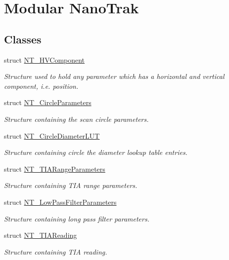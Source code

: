 \hypertarget{group___modular_nano_trak}{}\section{Modular Nano\+Trak}
\label{group___modular_nano_trak}
\subsection*{Classes}
\begin{DoxyCompactItemize}
\item 
struct \hyperlink{struct_n_t___h_v_component}{N\+T\+\_\+\+H\+V\+Component}
\begin{DoxyCompactList}\small\item\em Structure used to hold any parameter which has a horizontal and vertical component, i.\+e. position. \end{DoxyCompactList}\item 
struct \hyperlink{struct_n_t___circle_parameters}{N\+T\+\_\+\+Circle\+Parameters}
\begin{DoxyCompactList}\small\item\em Structure containing the scan circle parameters. \end{DoxyCompactList}\item 
struct \hyperlink{struct_n_t___circle_diameter_l_u_t}{N\+T\+\_\+\+Circle\+Diameter\+L\+UT}
\begin{DoxyCompactList}\small\item\em Structure containing circle the diameter lookup table entries. \end{DoxyCompactList}\item 
struct \hyperlink{struct_n_t___t_i_a_range_parameters}{N\+T\+\_\+\+T\+I\+A\+Range\+Parameters}
\begin{DoxyCompactList}\small\item\em Structure containing T\+IA range parameters. \end{DoxyCompactList}\item 
struct \hyperlink{struct_n_t___low_pass_filter_parameters}{N\+T\+\_\+\+Low\+Pass\+Filter\+Parameters}
\begin{DoxyCompactList}\small\item\em Structure containing long pass filter parameters. \end{DoxyCompactList}\item 
struct \hyperlink{struct_n_t___t_i_a_reading}{N\+T\+\_\+\+T\+I\+A\+Reading}
\begin{DoxyCompactList}\small\item\em Structure containing T\+IA reading. \end{DoxyCompactList}\item 

\end{DoxyCompactItemize}
